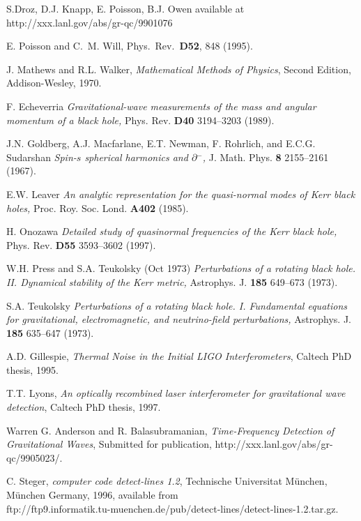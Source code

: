 \documentclass[11pt]{article}
\providecommand{\eth}{\partial\!\!{}^{-}}
\begin{document}
\begin{thebibliography}{99}
S.Droz, D.J. Knapp, E. Poisson, B.J. Owen available at\\
{http://xxx.lanl.gov/abs/gr-qc/9901076}

E. Poisson and C.~M. Will, Phys.\ Rev.\  {\bf D52}, 848 (1995).

J. Mathews and R.L. Walker, {\it Mathematical Methods of Physics},
Second Edition, Addison-Wesley, 1970.

F. Echeverria \emph{Gravitational-wave measurements of the mass
  and angular momentum of a black hole,} Phys. Rev. \textbf{D40}
  3194--3203 (1989).

J.N. Goldberg, A.J. Macfarlane, E.T. Newman, F. Rohrlich, and E.C.G. Sudarshan
  \emph{Spin-$s$ spherical harmonics and $\eth$,} J. Math. Phys.
  \textbf{8} 2155--2161 (1967).

E.W. Leaver \emph{An analytic representation for the quasi-normal
  modes of {K}err black holes,} Proc. Roy. Soc. Lond. \textbf{A402} (1985).

H. Onozawa \emph{Detailed study of quasinormal frequencies of the
  {K}err black hole,} Phys. Rev. \textbf{D55} 3593--3602 (1997).

W.H. Press and S.A. Teukolsky (Oct 1973) \emph{Perturbations of a rotating
  black hole. {II}. {D}ynamical stability of the {K}err metric,}
  Astrophys. J. \textbf{185} 649--673 (1973).

S.A. Teukolsky \emph{Perturbations of a rotating black hole. {I}.
  {F}undamental equations for gravitational, electromagnetic, and
  neutrino-field perturbations,} Astrophys. J. \textbf{185} 635--647 (1973).

A.D. Gillespie, {\it Thermal Noise in the Initial LIGO Interferometers},
Caltech PhD thesis, 1995.

T.T. Lyons, {\it An optically recombined laser interferometer for
gravitational wave detection}, Caltech PhD thesis, 1997.

Warren G. Anderson and R. Balasubramanian, {\em Time-Frequency Detection
of Gravitational Waves},
Submitted for publication,
{http://xxx.lanl.gov/abs/gr-qc/9905023/}.

C. Steger, {\em {\rm computer code} {\sc detect-lines 1.2}},
Technische Universitat M\"{u}nchen, M\"{u}nchen Germany, 1996, available from\\
{ftp://ftp9.informatik.tu-muenchen.de/pub/detect-lines/detect-lines-1.2.tar.gz}.


\end{thebibliography}
\end{document}
